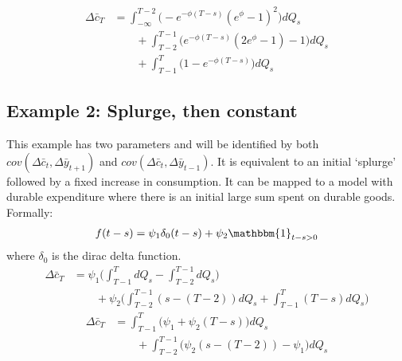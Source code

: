 \documentclass[12pt,pdftex,letterpaper]{article}
\begin{document}
\begin{align*}
\Delta \bar{c}_T &=   \int_{-\infty}^{T-2} \Big(-e^{-\phi (T-s)}(e^{\phi}-1)^2  \Big) dQ_s \\
& \qquad +  \int_{T-2}^{T-1} \Big(e^{-\phi (T-s)}(2e^{\phi}-1) - 1 \Big) dQ_s \\
& \qquad + \int_{T-1}^{T} \Big( 1-e^{-\phi (T-s)} \Big) dQ_s
\end{align*}

\subsection{Example 2: Splurge, then constant}
This example has two parameters and will be identified by both $cov(\Delta \bar{c}_t,\Delta \bar{y}_{t+1})$ and $cov(\Delta \bar{c}_t,\Delta \bar{y}_{t-1})$. It is equivalent to an initial `splurge' followed by a fixed increase in consumption. It can be mapped to a model with durable expenditure where there is an initial large sum spent on durable goods. Formally:
\begin{align*}
f(t-s) = \psi_1 \delta_0(t-s) + \psi_2 \mathbbm{1}_{t-s>0}
\end{align*}
where $\delta_0$ is the dirac delta function.
\begin{align*}
\Delta \bar{c}_T &=  \psi_1 \Big( \int_{T-1}^{T} dQ_s- \int_{T-2}^{T-1}dQ_s \Big) \\
& \qquad + \psi_2 \Big(\int_{T-2}^{T-1} (s-(T-2))dQ_s  + \int_{T-1}^{T} (T-s)dQ_s \Big)
\end{align*}
\begin{align*}
\Delta \bar{c}_T &=   \int_{T-1}^{T} \big( \psi_1 +\psi_2 (T-s)\big) dQ_s \\
& \qquad + \int_{T-2}^{T-1} \big(\psi_2  (s-(T-2)) -\psi_1 \big) dQ_s 
\end{align*}
\end{document}
